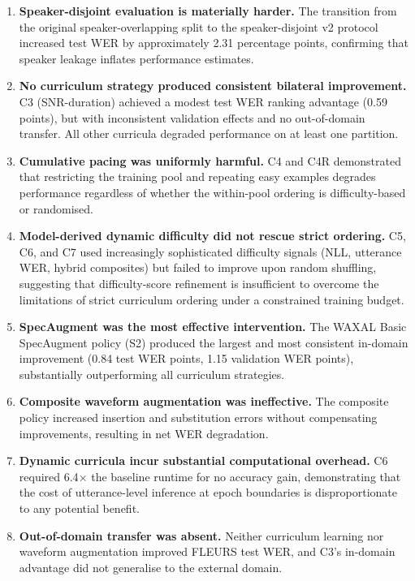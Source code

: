 \begin{enumerate}
    \item \textbf{Speaker-disjoint evaluation is materially harder.} The
    transition from the original speaker-overlapping split to the
    speaker-disjoint v2 protocol increased test WER by approximately 2.31
    percentage points, confirming that speaker leakage inflates performance
    estimates.
    
    \item \textbf{No curriculum strategy produced consistent bilateral
    improvement.} C3 (SNR-duration) achieved a modest test WER ranking
    advantage (0.59 points), but with inconsistent validation effects and no
    out-of-domain transfer. All other curricula degraded performance on at least
    one partition.
    
    \item \textbf{Cumulative pacing was uniformly harmful.} C4 and C4R
    demonstrated that restricting the training pool and repeating easy examples
    degrades performance regardless of whether the within-pool ordering is
    difficulty-based or randomised.
    
    \item \textbf{Model-derived dynamic difficulty did not rescue strict
    ordering.} C5, C6, and C7 used increasingly sophisticated difficulty signals
    (NLL, utterance WER, hybrid composites) but failed to improve upon random
    shuffling, suggesting that difficulty-score refinement is insufficient to
    overcome the limitations of strict curriculum ordering under a constrained
    training budget.
    
    \item \textbf{SpecAugment was the most effective intervention.} The WAXAL
    Basic SpecAugment policy (S2) produced the largest and most consistent
    in-domain improvement (0.84 test WER points, 1.15 validation WER points),
    substantially outperforming all curriculum strategies.
    
    \item \textbf{Composite waveform augmentation was ineffective.} The composite
    policy increased insertion and substitution errors without compensating
    improvements, resulting in net WER degradation.
    
    \item \textbf{Dynamic curricula incur substantial computational overhead.}
    C6 required 6.4$\times$ the baseline runtime for no accuracy gain,
    demonstrating that the cost of utterance-level inference at epoch boundaries
    is disproportionate to any potential benefit.
    
    \item \textbf{Out-of-domain transfer was absent.} Neither curriculum learning
    nor waveform augmentation improved FLEURS test WER, and C3's in-domain
    advantage did not generalise to the external domain.
\end{enumerate}

